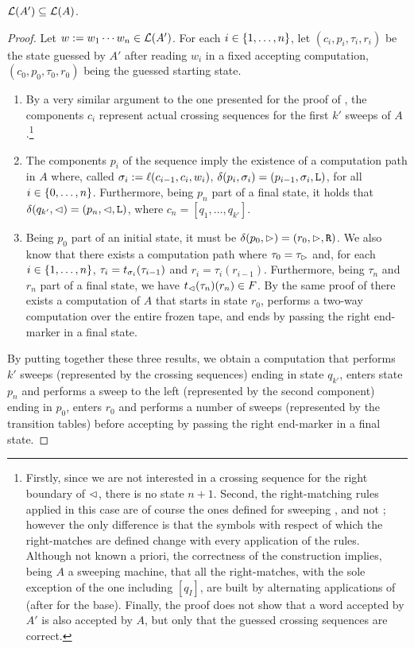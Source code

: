 \begin{lemm}\label{lem:swkLAtoNFA-2}
	$\mathcal L(A')\subseteq\mathcal L(A)$.
\end{lemm}
\begin{proof}
	Let $w:=w_1\cdots w_n\in\mathcal L(A')$. For each $i\in\{1,\dots,n\}$, let $(c_i,p_i,\tau_i,r_i)$ be the state guessed by $A'$ after reading $w_i$ in a fixed accepting computation, $(c_0,p_0,\tau_0,r_0)$ being the guessed starting state.
	\begin{enumerate}
		\item By a very similar argument to the one presented for the proof of , the components $c_i$ represent actual crossing sequences for the first $k'$ sweeps of $A$.\footnote{%
			      Firstly, since we are not interested in a crossing sequence for the right boundary of $\lhd$, there is no state $n+1$.
			      Second, the right-matching rules applied in this case are of course the ones defined for sweeping \kDLAs, and not \TDFAs; however the only difference is that the symbols with respect of which the right-matches are defined change with every application of the rules.
			      Although not known a priori, the correctness of the construction implies, being $A$ a sweeping machine, that all the right-matches, with the sole exception of the one including $[q_I]$, are built by alternating applications of  (after  for the base).
			      Finally, the proof does not show that a word accepted by $A'$ is also accepted by $A$, but only that the guessed crossing sequences are correct.}
		\item The components $p_i$ of the sequence imply the existence of a computation path in $A$ where, called $\sigma_i:=\ell(c_{i-1},c_i,w_i)$, $\delta(p_i,\sigma_i)=(p_{i-1},\sigma_i,\mathtt L)$, for all $i\in\{0,\dots,n\}$.
		      Furthermore, being $p_n$ part of a final state, it holds that $\delta(q_{k'},\lhd)=(p_n,\lhd,\mathtt L)$, where $c_n=[q_1,\dots,q_{k'}]$.
		\item Being $p_0$ part of an initial state, it must be $\delta(p_0,\rhd)=(r_0,\rhd,\mathtt R)$.
		      We also know that there exists a computation path where $\tau_0=\tau_\rhd$ and, for each $i\in\{1,\dots,n\}$, $\tau_i=t_{\sigma_i}(\tau_{i-1})$ and $r_i=\tau_i(r_{i-1})$.
		      Furthermore, being $\tau_n$ and $r_n$ part of a final state, we have $t_\lhd(\tau_n)(r_n)\in F$.
		      By the same proof of  there exists a computation of $A$ that starts in state $r_0$, performs a two-way computation over the entire frozen tape, and ends by passing the right end-marker in a final state.
	\end{enumerate}
	By putting together these three results, we obtain a computation that performs $k'$ sweeps (represented by the crossing sequences) ending in state $q_{k'}$, enters state $p_n$ and performs a sweep to the left (represented by the second component) ending in $p_0$, enters $r_0$ and performs a number of sweeps (represented by the transition tables) before accepting by passing the right end-marker in a final state.
\end{proof}


